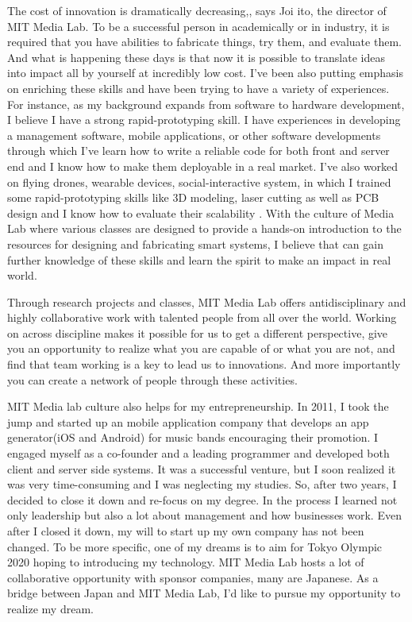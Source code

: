 \documentclass{article}
\begin{document}
The cost of innovation is dramatically decreasing,, says Joi ito, the director of MIT Media Lab. To be a successful person in academically or in industry, it is required that you have abilities to fabricate things, try them, and evaluate them. And what is happening these days is that now it is possible to translate ideas into impact all by yourself at incredibly low cost.  I've been also putting emphasis on enriching these skills and have been trying to have a variety of experiences. For instance,  as my background expands from software to hardware development, I believe I have a strong rapid-prototyping skill.  I have experiences in developing a management software, mobile applications, or other software developments through which I've learn how to write a reliable code for both front and server end and I know how to make them deployable in a real market. I've also worked on flying drones, wearable devices, social-interactive system, in which I trained some rapid-prototyping skills like 3D modeling, laser cutting as well as PCB design and I know how to evaluate their scalability . With the culture of Media Lab where various classes are designed to provide a hands-on introduction to the resources for designing and fabricating smart systems, I believe that can gain further knowledge of these skills and learn the spirit to make an impact in real world.

 Through research projects and classes, MIT Media Lab offers antidisciplinary and highly collaborative work with talented people from all over the world. Working on across discipline makes it possible for us to get a different perspective, give you an opportunity to realize what you are capable of or what you are not, and find that team working is a key to lead us to innovations. And more importantly you can create a network of people through these activities.
 
MIT Media lab culture also helps for my entrepreneurship. In 2011, I took the jump and started up an mobile application company that develops an app generator(iOS and Android) for music bands encouraging their promotion. I engaged myself as a co-founder and a leading programmer and developed both client and server side systems. It was a successful venture, but I soon realized it was very time-consuming and I was neglecting my studies. So, after two years, I decided to close it down and re-focus on my degree. In the process I learned not only leadership but also a lot about management and how businesses work. Even after I closed it down, my will to start up my own company has not been changed. To be more specific, one of my dreams is to aim for Tokyo Olympic 2020 hoping to introducing my technology. MIT Media Lab hosts a lot of collaborative opportunity with sponsor companies, many are Japanese. As a bridge between Japan and MIT Media Lab, I'd like to pursue my opportunity to realize my dream.
\end{document}
